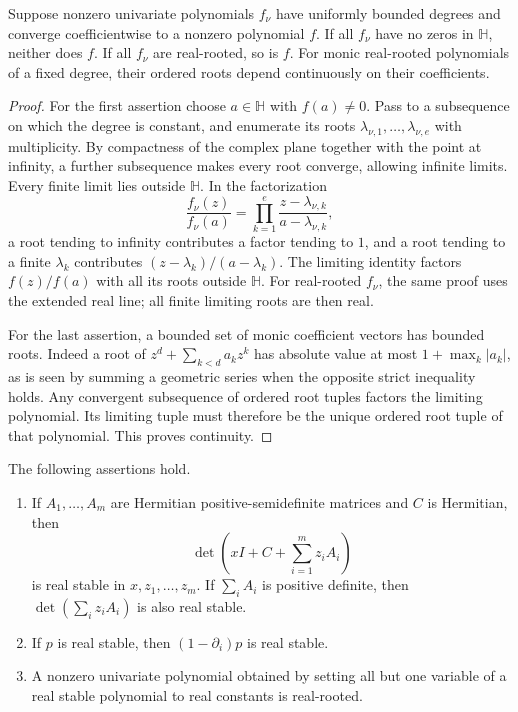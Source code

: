 \begin{lemma}
\label{lem:mss-polynomial-limits}
Suppose nonzero univariate polynomials $f_\nu$ have uniformly bounded
degrees and converge coefficientwise to a nonzero polynomial $f$.
If all $f_\nu$ have no zeros in $\mathbb H$, neither does $f$.
If all $f_\nu$ are real-rooted, so is $f$.
For monic real-rooted polynomials of a fixed degree, their ordered
roots depend continuously on their coefficients.
\end{lemma}

\begin{proof}
For the first assertion choose $a\in\mathbb H$ with $f(a)\ne0$.
Pass to a subsequence on which the degree is constant, and enumerate
its roots $\lambda_{\nu,1},\ldots,\lambda_{\nu,e}$ with multiplicity.
By compactness of the complex plane together with the point at
infinity, a further subsequence makes every root converge, allowing
infinite limits.  Every finite limit lies outside $\mathbb H$.
In the factorization
\[
 \frac{f_\nu(z)}{f_\nu(a)}
   =\prod_{k=1}^e\frac{z-\lambda_{\nu,k}}{a-\lambda_{\nu,k}},
\]
a root tending to infinity contributes a factor tending to $1$, and
a root tending to a finite $\lambda_k$ contributes
$(z-\lambda_k)/(a-\lambda_k)$.  The limiting identity factors
$f(z)/f(a)$ with all its roots outside $\mathbb H$.
For real-rooted $f_\nu$, the same proof uses the extended real line;
all finite limiting roots are then real.

For the last assertion, a bounded set of monic coefficient vectors
has bounded roots.  Indeed a root of
$z^d+\sum_{k<d}a_kz^k$ has absolute value at most
$1+\max_k|a_k|$, as is seen by summing a geometric series when the
opposite strict inequality holds.  Any convergent subsequence of
ordered root tuples factors the limiting polynomial.  Its limiting
tuple must therefore be the unique ordered root tuple of that
polynomial.  This proves continuity.
\end{proof}

\begin{lemma}
\label{lem:mss-stability}
The following assertions hold.
\begin{enumerate}
\item If $A_1,\ldots,A_m$ are Hermitian positive-semidefinite matrices
and $C$ is Hermitian, then
\[
 \det\left(xI+C+\sum_{i=1}^m z_iA_i\right)
\]
is real stable in $x,z_1,\ldots,z_m$.
If $\sum_iA_i$ is positive definite, then
$\det(\sum_i z_iA_i)$ is also real stable.
\item If $p$ is real stable, then $(1-\partial_i)p$ is real stable.
\item A nonzero univariate polynomial obtained by setting all but one
variable of a real stable polynomial to real constants is real-rooted.
\end{enumerate}
\end{lemma}


